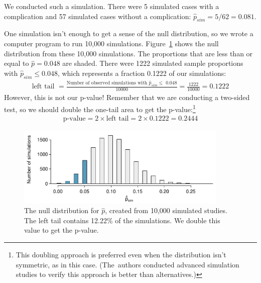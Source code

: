We conducted such a simulation. There were 5 simulated cases with a complication and 57 simulated cases without a complication: $\hat{p}_{sim} = 5/62 = 0.081$.


One simulation isn't enough to get a sense of the null distribution, so we wrote a computer program to run 10,000 simulations. Figure~\ref{MedConsNullSim} shows the null distribution from these 10,000 simulations. The proportions that are less than or equal to $\hat{p}=0.048$ are shaded. There were 1222 simulated sample proportions with $\hat{p}_{sim} \leq 0.048$, which represents a fraction 0.1222 of our simulations:
\begin{align*}
\text{left tail }
	= \frac{\text{Number of observed simulations with }\hat{p}_{sim}\leq\text{ 0.048}}{10000}
	= \frac{1222}{10000} = 0.1222
\end{align*}
However, this is not our p-value! Remember that we are conducting a two-sided test, so we should double the one-tail area to get the p-value:\footnote{This doubling approach is preferred even when the distribution isn't symmetric, as in this case. (The~authors conducted advanced simulation studies to verify this approach is better than alternatives.)}
\begin{align*}
\text{p-value} = 2 \times \text{left tail} = 2 \times 0.1222 = 0.2444
\end{align*}

\begin{figure}[ht]
\centering
\includegraphics[width=0.9\textwidth]{02/figures/MedicalConsultant/MedConsNullSim}
\caption{The null distribution for $\hat{p}$, created from 10,000 simulated studies. The left tail contains 12.22\% of the simulations. We double this value to get the p-value.}
\label{MedConsNullSim}
\end{figure}

